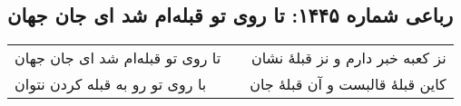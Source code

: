 \begin{center}
\section*{رباعی شماره ۱۴۴۵: تا روی تو قبله‌ام شد ای جان جهان}
\label{sec:1445}
\begin{longtable}{l p{0.5cm} r}
تا روی تو قبله‌ام شد ای جان جهان
&&
نز کعبه خبر دارم و نز قبلهٔ نشان
\\
با روی تو رو به قبله کردن نتوان
&&
کاین قبلهٔ قالبست و آن قبلهٔ جان
\\
\end{longtable}
\end{center}
